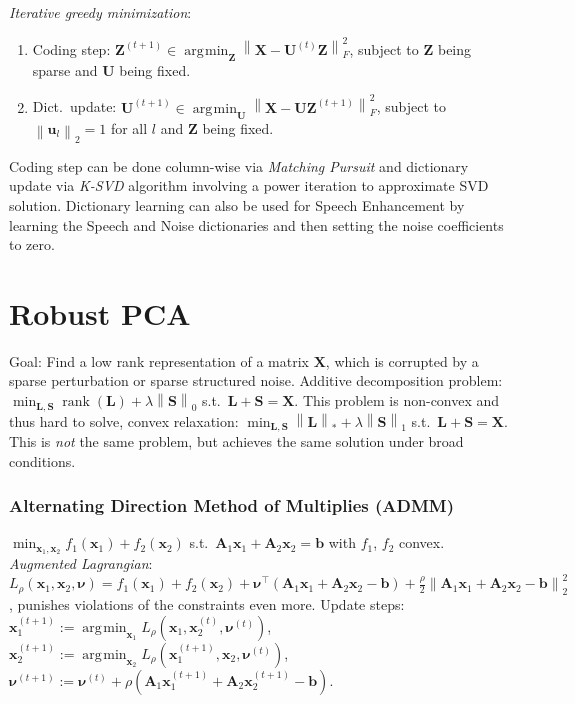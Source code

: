 \documentclass[11pt,a4paper,technote]{IEEEtran}
\DeclareMathOperator*{\argmin}{\arg\!\min}
\newcommand{\norm}[1]{\left\lVert#1\right\rVert}
\newcommand{\matr}[1]{\boldsymbol{\mathbf{#1}}}
\newcommand{\vect}[1]{\boldsymbol{\mathbf{#1}}}
\newcommand{\trns}[1]{#1^{\top}}
\DeclareMathOperator{\rank}{rank}
\begin{document}
\emph{Iterative greedy minimization}:
\begin{enumerate}
  \item Coding step: $\matr{Z}^{(t+1)}\in\argmin_{\matr{Z}}\norm{\matr{X} -
      \matr{U}^{(t)}\matr{Z}}_F^2$, subject to $\matr{Z}$ being sparse and
    $\matr{U}$ being fixed.
  \item Dict.\ update: $\matr{U}^{(t+1)}\in\argmin_{\matr{U}} \norm{\matr{X} -
      \matr{U}\matr{Z}^{(t+1)}}_F^2$, subject to $\norm{\vect{u}_l}_2 = 1$ for
    all $l$ and $\matr{Z}$ being fixed.
\end{enumerate}
Coding step can be done column-wise via \emph{Matching Pursuit} and dictionary
update via \emph{K-SVD} algorithm involving a power iteration to approximate SVD
solution. Dictionary learning can also be used for Speech Enhancement by learning
the Speech and Noise dictionaries and then setting the noise coefficients to zero.

\section*{Robust PCA}
Goal: Find a low rank representation of a matrix $\matr{X}$, which is corrupted
by a sparse perturbation or sparse structured noise.
Additive decomposition problem: $\min_{\matr{L},\matr{S}} \rank(\matr{L}) +
\lambda \norm{\matr{S}}_0$ s.t.\ $\matr{L}+\matr{S} = \matr{X}$. This
problem is non-convex and thus hard to solve, convex relaxation:
$\min_{\matr{L},\matr{S}} \norm{\matr{L}}_* + \lambda \norm{\matr{S}}_1$ s.t.\
$\matr{L}+\matr{S} = \matr{X}$. This is \emph{not} the same problem, but
achieves the same solution under broad conditions.

\subsubsection*{Alternating Direction Method of Multiplies (ADMM)}
$\min_{\vect{x}_1,\vect{x}_2} f_1(\vect{x}_1) + f_2(\vect{x}_2)$ s.t.\
$\matr{A}_1 \vect{x}_1 + \matr{A}_2\vect{x}_2 = \vect{b}$ with $f_1$, $f_2$
convex. \emph{Augmented Lagrangian}: $L_{\rho}(\vect{x}_1,\vect{x}_2,\vect{\nu})
= f_1(\vect{x}_1) + f_2(\vect{x}_2) + \trns{\vect{\nu}}(\matr{A}_1\vect{x}_1 +
\matr{A}_2 \vect{x}_2 - \vect{b}) + \frac{\rho}{2}\norm{\matr{A}_1\vect{x}_1 +
  \matr{A}_2\vect{x}_2 - \vect{b}}_2^2$, punishes violations of the constraints
even more. Update steps: $\vect{x}_1^{(t+1)} := \argmin_{\vect{x}_1}
L_{\rho}(\vect{x}_1, \vect{x}_2^{(t)}, \vect{\nu}^{(t)})$, $\vect{x}_2^{(t+1)}
:= \argmin_{\vect{x}_2} L_{\rho}(\vect{x}_1^{(t+1)}, \vect{x}_2,
\vect{\nu}^{(t)})$, $\vect{\nu}^{(t+1)} := \vect{\nu}^{(t)} + \rho(\matr{A}_1
\vect{x}_1^{(t+1)} + \matr{A}_2\vect{x}_2^{(t+1)} - \vect{b})$.
\end{document}
